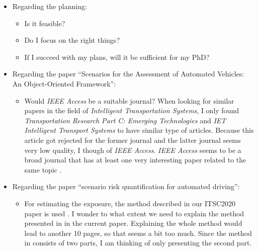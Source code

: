 \documentclass[10pt,final,a4paper,oneside,onecolumn]{article}
\begin{document}
\begin{itemize}
	\item Regarding the planning:
	\begin{itemize}
		\item Is it feasible?
		\item Do I focus on the right things?
		\item If I succeed with my plans, will it be sufficient for my PhD?
	\end{itemize}

	\item Regarding the paper ``Scenarios for the Assessment of Automated Vehicles: An Object-Oriented Framework'':
	\begin{itemize}
		\item Would \textit{IEEE Access} be a suitable journal? When looking for similar papers in the field of \emph{Intelligent Transportation Systems}, I only found \textit{Transportation Research Part C: Emerging Technologies} and \textit{IET Intelligent Transport Systems} to have similar type of articles. Because this article got rejected for the former journal and the latter journal seems very low quality, I though of \textit{IEEE Access}. \textit{IEEE Access} seems to be a broad journal that has at least one very interesting paper related to the same topic \cite{riedmaier2020survey}.
	\end{itemize}
	\item Regarding the paper ``scenario risk quantification for automated driving'':
	\begin{itemize}
		\item For estimating the exposure, the method described in our ITSC2020 paper is used \cite{degelder2020scenariomining}. I wonder to what extent we need to explain the method presented in \cite{degelder2020scenariomining} in the current paper. Explaining the whole method would lead to another 10 pages, so that seems a bit too much. Since the method in \cite{degelder2020scenariomining} consists of two parts, I am thinking of only presenting the second part. 
	\end{itemize}
\end{itemize}


\printbibliography

\clearpage


\end{document}
